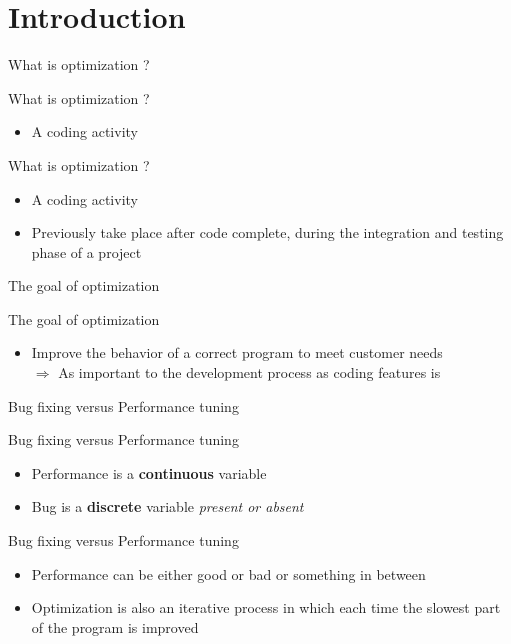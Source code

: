 \documentclass[aspectratio=169,xcolor=dvipsnames]{beamer}
\begin{document}
\section{Introduction}
\begin{frame}{What is optimization ?}
\end{frame}
\begin{frame}{What is optimization ?}
    \begin{itemize}
        \item A coding activity
    \end{itemize}
\end{frame}
\begin{frame}{What is optimization ?}
    \begin{itemize}
        \item A coding activity
        \item Previously take place after code complete, during the integration and testing phase of a project
    \end{itemize}
\end{frame}

\begin{frame}{The goal of optimization}
\end{frame}
\begin{frame}{The goal of optimization}
    \begin{itemize}
        \item Improve the behavior of a correct program to meet customer needs\\ 
    $\Rightarrow$ As important to the development process as coding features is 
    \end{itemize}
\end{frame}

\begin{frame}{Bug fixing versus Performance tuning}
\end{frame}
\begin{frame}{Bug fixing versus Performance tuning}
\begin{itemize}
    \item Performance is a \textbf{continuous} variable  
    \item Bug is a \textbf{discrete} variable \textit{present or absent}
\end{itemize}
\end{frame}
\begin{frame}{Bug fixing versus Performance tuning}
    \begin{itemize}
        \item Performance can be either good or bad or something in between
        \item Optimization is also an iterative process in which each time the slowest part of the program is improved
    \end{itemize}
\end{frame}
\end{document}
